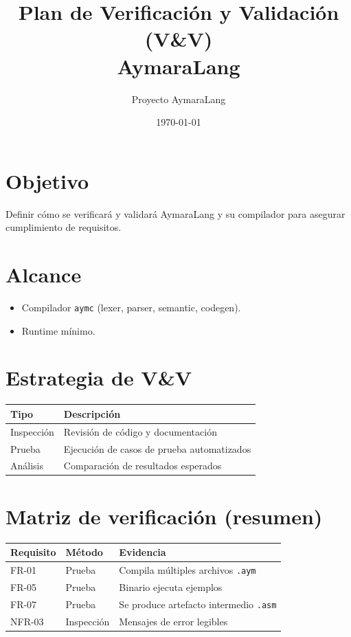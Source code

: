 \documentclass[11pt,a4paper]{article}
\title{Plan de Verificación y Validación (V\&V)\\AymaraLang}
\author{Proyecto AymaraLang}
\date{\today}
\begin{document}
\maketitle

\section{Objetivo}
Definir cómo se verificará y validará AymaraLang y su compilador para asegurar cumplimiento de requisitos.

\section{Alcance}
\begin{itemize}
    \item Compilador \texttt{aymc} (lexer, parser, semantic, codegen).
    \item Runtime mínimo.
\end{itemize}

\section{Estrategia de V\&V}
\begin{longtable}{@{}p{3cm}p{10cm}@{}}
\toprule
\textbf{Tipo} & \textbf{Descripción} \\ \midrule
Inspección & Revisión de código y documentación \\
Prueba & Ejecución de casos de prueba automatizados \\
Análisis & Comparación de resultados esperados \\ \bottomrule
\end{longtable}

\section{Matriz de verificación (resumen)}
\begin{longtable}{@{}p{3cm}p{3cm}p{7cm}@{}}
\toprule
\textbf{Requisito} & \textbf{Método} & \textbf{Evidencia} \\ \midrule
FR-01 & Prueba & Compila múltiples archivos \texttt{.aym} \\
FR-05 & Prueba & Binario ejecuta ejemplos \\
FR-07 & Prueba & Se produce artefacto intermedio \texttt{.asm} \\
NFR-03 & Inspección & Mensajes de error legibles \\ \bottomrule
\end{longtable}
\end{document}
